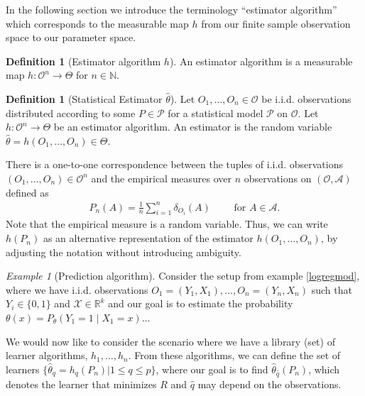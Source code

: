 \documentclass[11pt, a4paper]{article}
\theoremstyle{definition}
\newtheorem{definition}[theorem]{Definition}
\theoremstyle{remark}
\newtheorem{example}{Example}
\newcommand{\cl}{q}
\newcommand{\btheta}{h}
\begin{document}
In the following section we introduce the terminology ``estimator algorithm'' which corresponds to the measurable map $ h $ from our finite sample observation space to our parameter space. 
\begin{definition}[Estimator algorithm $ \btheta $]
    An estimator algorithm is a measurable map $ \btheta : \mathcal{O}^{n} \to \Theta $ for $ n \in \mathbb{N} $. 
\end{definition}
\begin{definition}[Statistical Estimator $ \hat{\theta} $]
    Let $ O_1, \ldots, O_n \in \mathcal{O} $ be i.i.d. observations distributed according to some $ P \in \mathcal{P} $ for a statistical model $ \mathcal{P} $ on $ \mathcal{O} $. Let $ \btheta : \mathcal{O}^{n} \to \Theta $ be an estimator algorithm. An estimator is the random variable $ \hat{\theta} = \btheta(O_1 ,\ldots , O_n) \in \Theta $. 
\end{definition}
There is a one-to-one correspondence between the tuples of i.i.d. observations $ (O_1 , \ldots, O_n) \in \mathcal{O}^{n} $ and the empirical measures over $ n $ observations on $ (\mathcal{O} , \mathcal{A}) $ defined as  
\begin{align*}
    P_n(A) = \frac{1}{n} \sum_{i = 1}^{n} \delta_{O_i}(A)\qquad \text{ for } A \in \mathcal{A}.
\end{align*}
Note that the empirical measure is a random variable. Thus, we can write $ \btheta(P_n)$ as an alternative representation of the estimator $\btheta(O_1, \ldots, O_n)$, by adjusting the notation without introducing ambiguity. 

\begin{example}[Prediction algorithm] 
    Consider the setup from example \ref{logregmod}, where we have i.i.d. observations $ O_1 = (Y_1 , X_1) ,\ldots, O_n = (Y_n , X_n) $ such that $ Y_i \in \{0,1\} $ and $ \mathcal{X}\in \mathbb{R}^{k} $ and our goal is to estimate the probability $ \theta(x) = P_{\theta}(Y_1 = 1 \mid X_1 = x ) $...
\end{example}
We would now like to consider the scenario where we have a library (set) of learner algorithms, $ \btheta_1 , \ldots, \btheta_n $. From these algorithms, we can define the set of learners $ \{ \hat{\theta} _{\cl} = \btheta_{\cl}(P_n) | 1 \leq \cl \leq p \} $, where our goal is to find $ \hat{\theta}_{ \hat{\cl} }(P_n) $, which denotes the learner that minimizes $ R $ and $ \hat{\cl}  $ may depend on the observations. 
\end{document}
